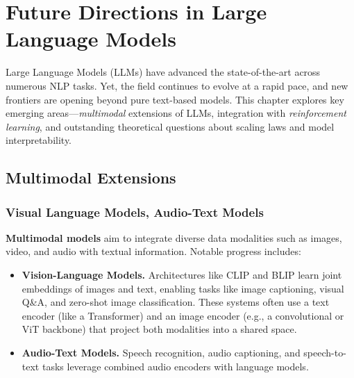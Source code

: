 \chapter{Future Directions in Large Language Models}
\label{chap:future_directions}

\noindent
Large Language Models (LLMs) have advanced the state-of-the-art across numerous NLP tasks. Yet, the field continues to evolve at a rapid pace, and new frontiers are opening beyond pure text-based models. This chapter explores key emerging areas—\emph{multimodal} extensions of LLMs, integration with \emph{reinforcement learning}, and outstanding theoretical questions about scaling laws and model interpretability.

\section{Multimodal Extensions}
\label{sec:multimodal_extensions}

\subsection{Visual Language Models, Audio-Text Models}
\noindent
\textbf{Multimodal models} aim to integrate diverse data modalities such as images, video, and audio with textual information. Notable progress includes:
\begin{itemize}
    \item \textbf{Vision-Language Models.} Architectures like CLIP and BLIP learn joint embeddings of images and text, enabling tasks like image captioning, visual Q\&A, and zero-shot image classification. These systems often use a text encoder (like a Transformer) and an image encoder (e.g., a convolutional or ViT backbone) that project both modalities into a shared space.
    \item \textbf{Audio-Text Models.} Speech recognition, audio captioning, and speech-to-text tasks leverage combined audio encoders with language models.
\end{itemize}

